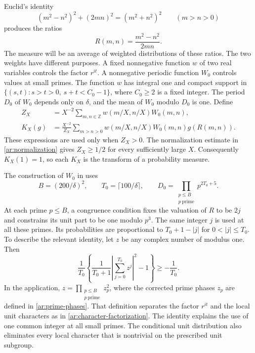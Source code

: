 \documentclass[twoside]{aomart}
\theoremstyle{paperplain}
\theoremstyle{paperdefinition}
\newcommand{\Z}{\mathbb Z}
\numberwithin{equation}{section}
\begin{document}
Euclid's identity
\begin{equation*}
 (m^2-n^2)^2+(2mn)^2=(m^2+n^2)^2
 \qquad(m>n>0)
\end{equation*}
produces the ratios
\begin{equation*}
 R(m,n)=\frac{m^2-n^2}{2mn}.
\end{equation*}
The measure will be an average of weighted distributions of these
ratios. The two weights have different purposes. A fixed nonnegative
function $w$ of two real variables controls the factor $r^{it}$.
A nonnegative periodic function $W_0$ controls values at small
primes. The function $w$ has integral one and compact support in
$\{(s,t):s>t>0,\ s+t<C_0-1\}$, where $C_0\ge2$ is a fixed integer.
The period $D_0$ of $W_0$ depends only on $\delta$, and the mean of
$W_0$ modulo $D_0$ is one. Define
\begin{equation*}
 \begin{aligned}
 Z_X&=X^{-2}\sum_{m,n\in\Z}w(m/X,n/X)W_0(m,n),\\
 K_X(g)&=\frac{X^{-2}}{Z_X}
       \sum_{m>n>0}w(m/X,n/X)W_0(m,n)g(R(m,n)).
 \end{aligned}
\end{equation*}
These expressions are used only when $Z_X>0$. The normalization
estimate in \eqref{ar:normalization} gives $Z_X\ge1/2$ for every
sufficiently large $X$. Consequently $K_X(1)=1$, so each $K_X$
is the transform of a probability measure.

The construction of $W_0$ in  uses
\begin{equation*}
 B=(200/\delta)^2,\qquad T_0=\lceil100/\delta\rceil,
 \qquad D_0=\prod_{\substack{p\le B\\p\ \mathrm{prime}}}p^{2T_0+5}.
\end{equation*}
At each prime $p\le B$, a congruence condition fixes the valuation
of $R$ to be $2j$ and constrains its unit part to be one modulo
$p^3$. The same integer $j$ is used at all these primes. Its
probabilities are proportional to $T_0+1-|j|$ for
$0<|j|\le T_0$. To describe the relevant identity, let $z$ be
any complex number of modulus one. Then
\begin{equation*}
 \frac1{T_0}\left\{
       \frac1{T_0+1}\left|\sum_{j=0}^{T_0}z^j\right|^2-1
       \right\}\ge-\frac1{T_0}.
\end{equation*}
In the application, $\displaystyle z=\prod_{\substack{p\le B\\p\ \mathrm{prime}}}z_p^2$, where the corrected
prime phases $z_p$ are defined in \eqref{ar:prime-phases}.
That definition separates the factor $r^{it}$ and the local unit
characters as in \eqref{ar:character-factorization}.
The identity explains the use of one common integer at all small
primes. The conditional unit distribution also eliminates every
local character that is nontrivial on the prescribed unit subgroup.
\end{document}
